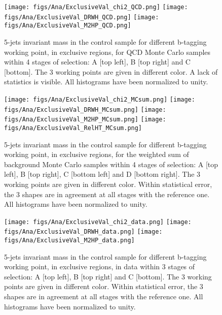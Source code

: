 \begin{figure}[!Hhtbp]
  \begin{center}
    \texttt{[image: figs/Ana/ExclusiveVal\_chi2\_QCD.png]}
    \texttt{[image: figs/Ana/ExclusiveVal\_DRWH\_QCD.png]}
    \texttt{[image: figs/Ana/ExclusiveVal\_M2HP\_QCD.png]}
    \caption{5-jets invariant mass in the control sample for different b-tagging working point, in exclusive regions, for QCD Monte Carlo samples within 4 stages of selection: A [top left], B [top right] and C [bottom]. The 3 working points are given in different color. A lack of statistics is visible. All histograms have been normalized to unity.}
    \label{fig:StageExWPQCD}
  \end{center}
\end{figure}

\begin{figure}[!Hhtbp]
  \begin{center}
    \texttt{[image: figs/Ana/ExclusiveVal\_chi2\_MCsum.png]}
    \texttt{[image: figs/Ana/ExclusiveVal\_DRWH\_MCsum.png]}
    \texttt{[image: figs/Ana/ExclusiveVal\_M2HP\_MCsum.png]}
    \texttt{[image: figs/Ana/ExclusiveVal\_RelHT\_MCsum.png]}
    \caption{5-jets invariant mass in the control sample for different b-tagging working point, in exclusive regions, for the weighted sum of background Monte Carlo samples within 4 stages of selection: A [top left], B [top right], C [bottom left] and D [bottom right]. The 3 working points are given in different color. Within statistical error, the 3 shapes are in agreement at all stages with the reference one. All histograms have been normalized to unity.}
    \label{fig:StageExWPSum}
  \end{center}
\end{figure}

\begin{figure}[!Hhtbp]
  \begin{center}
    \texttt{[image: figs/Ana/ExclusiveVal\_chi2\_data.png]}
    \texttt{[image: figs/Ana/ExclusiveVal\_DRWH\_data.png]}
    \texttt{[image: figs/Ana/ExclusiveVal\_M2HP\_data.png]}
    \caption{5-jets invariant mass in the control sample for different b-tagging working point, in exclusive regions, in data within 3 stages of selection: A [top left], B [top right] and C [bottom]. The 3 working points are given in different color. Within statistical error, the 3 shapes are in agreement at all stages with the reference one. All histograms have been normalized to unity.}
    \label{fig:StageExWPData}
  \end{center}
\end{figure}

